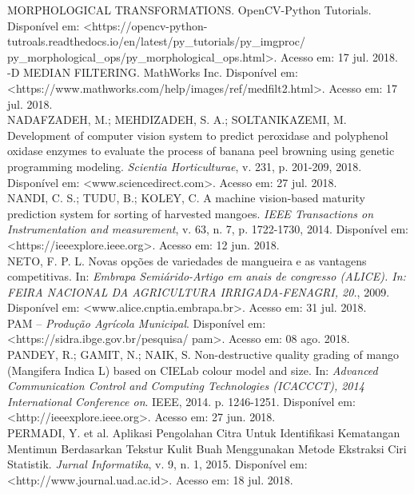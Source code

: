 \noindent MORPHOLOGICAL TRANSFORMATIONS. OpenCV-Python Tutorials. Disponível em: <https://opencv-python-tutroals.readthedocs.io/en/latest/py\_tutorials/py\_imgproc/
py\_morphological\_ops/py\_morphological\_ops.html>. Acesso em: 17 jul. 2018.
\\

-D MEDIAN FILTERING. MathWorks Inc. Disponível em: 
\\<https://www.mathworks.com/help/images/ref/medfilt2.html>.
Acesso em: 17 jul. 2018.
\\

\noindent NADAFZADEH, M.; MEHDIZADEH, S. A.; SOLTANIKAZEMI, M. Development of computer vision system to predict peroxidase and polyphenol oxidase enzymes to evaluate the process of banana peel browning using genetic programming modeling. \textit{Scientia Horticulturae}, v. 231, p. 201-209, 2018. Disponível em: <www.sciencedirect.com>. Acesso em: 27 jul. 2018.
\\

\noindent NANDI, C. S.; TUDU, B.; KOLEY, C. A machine vision-based maturity prediction system for sorting of harvested mangoes. \textit{IEEE Transactions on Instrumentation and measurement}, v. 63, n. 7, p. 1722-1730, 2014. Disponível em: <https://ieeexplore.ieee.org>. Acesso em: 12 jun. 2018.
\\

\noindent NETO, F. P. L. Novas opções de variedades de mangueira e as vantagens competitivas. In: \textit{Embrapa Semiárido-Artigo em anais de congresso (ALICE). In: FEIRA NACIONAL DA AGRICULTURA IRRIGADA-FENAGRI, 20.}, 2009. Disponível em: <www.alice.cnptia.embrapa.br>. Acesso em: 31 jul. 2018.
\\

\noindent PAM – \textit{Produção Agrícola Municipal}. Disponível em: <https://sidra.ibge.gov.br/pesquisa/
pam>. Acesso em: 08 ago. 2018.
\\

\noindent PANDEY, R.; GAMIT, N.; NAIK, S. Non-destructive quality grading of mango (Mangifera Indica L) based on CIELab colour model and size. In: \textit{Advanced Communication Control and Computing Technologies (ICACCCT), 2014 International Conference on}. IEEE, 2014. p. 1246-1251. Disponível em: <http://ieeexplore.ieee.org>. Acesso em: 27 jun. 2018.
\\

\noindent PERMADI, Y. et al. Aplikasi Pengolahan Citra Untuk Identifikasi Kematangan Mentimun Berdasarkan Tekstur Kulit Buah Menggunakan Metode Ekstraksi Ciri Statistik. \textit{Jurnal Informatika}, v. 9, n. 1, 2015. Disponível em: <http://www.journal.uad.ac.id>. Acesso em: 18 jul. 2018.
\\

